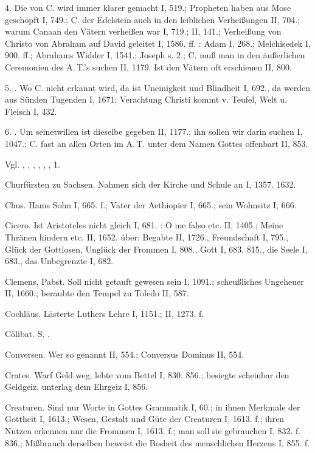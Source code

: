 4.  Die  von C. wird immer klarer gemacht I, 519.; Propheten haben aus Mose geschöpft I, 749.; C. der Edelstein auch in den leiblichen Verheißungen II, 704.; warum Canaan den Vätern verheißen war I, 719.; II, 141.; Verheißung von Christo von Abraham auf David geleitet I, 1586. ff. : Adam I, 268.; Melchisedek I, 900. ff.; Abrahams Widder I, 1541.; Joseph s.  2.; C. muß man in den äußerlichen Ceremonien des A.\,T.’s suchen II, 1179. Ist den Vätern oft erschienen II, 800.

5. . Wo C. nicht erkannt wird, da ist Uneinigkeit und Blindheit I, 692., da werden aus Sünden Tugenden I, 1671; Verachtung Christi kommt v. Teufel, Welt u. Fleisch I, 432.

6. . Um seinetwillen ist dieselbe gegeben II, 1177.; ihn sollen wir darin suchen I, 1047.; C. fast an allen Orten im A.\,T. unter dem Namen Gottes offenbart II, 853.

Vgl. , , , , , ,  1.

Churfürsten zu Sachsen. Nahmen sich der Kirche und Schule an I, 1357. 1632.

Chus. Hams Sohn I, 665. f.; Vater der Aethiopier I, 665.; sein Wohnsitz I, 666.

Cicero. Ist Aristoteles nicht gleich I, 681. : O me falso etc. II, 1405.; Meine Thränen hindern etc. II, 1652.  über: Begabte II, 1726., Freundschaft I, 795., Glück der Gottlosen, Unglück der Frommen I, 808., Gott I, 683. 815., die Seele I, 683., das Unbegrenzte I, 682.

Clemens, Pabst. Soll nicht getauft gewesen sein I, 1091.; scheußliches Ungeheuer II, 1660.; beraubte den Tempel zu Toledo II, 587.

Cochläus. Lästerte Luthers Lehre I, 1151.; II, 1273. f.

Cölibat. S. .

Conversen. Wer so genannt II, 554.; Conversus Dominus II, 554.

Crates. Warf Geld weg, lebte vom Bettel I, 830. 856.; besiegte scheinbar den Geldgeiz, unterlag dem Ehrgeiz I, 856.

Creaturen. Sind nur Worte in Gottes Grammatik I, 60.; in ihnen Merkmale der Gottheit I, 1613.; Wesen, Gestalt und Güte der Creaturen I, 1613. f.; ihren Nutzen erkennen nur die Frommen I, 1613. f.; man soll sie gebrauchen I, 832. f. 836.; Mißbrauch derselben beweist die Bosheit des menschlichen Herzens I, 855. f.

